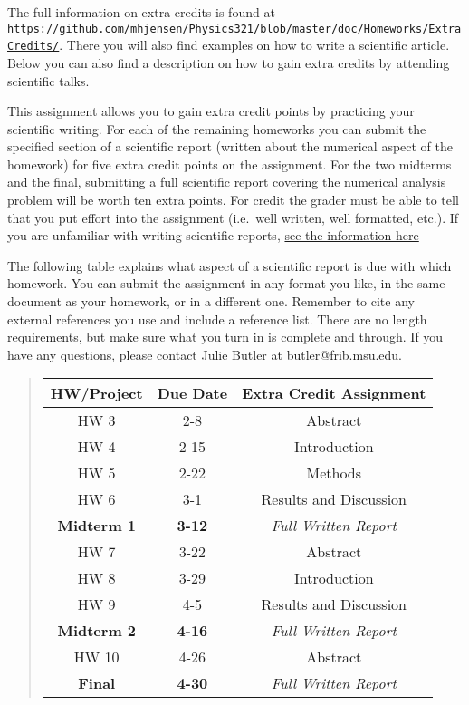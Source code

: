 \documentclass[%
oneside,                 %
final,                   %
10pt]{article}
\begin{document}
The full information on extra credits is found at \href{{https://github.com/mhjensen/Physics321/blob/master/doc/Homeworks/ExtraCredits/}}{\nolinkurl{https://github.com/mhjensen/Physics321/blob/master/doc/Homeworks/ExtraCredits/}}. There you will also find examples on how to write a scientific article. 
Below you can also find a description on how to gain extra credits by attending scientific talks.


This assignment allows you to gain extra credit points by practicing
your scientific writing.  For each of the remaining homeworks you can
submit the specified section of a scientific report (written about the
numerical aspect of the homework) for five extra credit points on the
assignment.  For the two midterms and the final, submitting a full
scientific report covering the numerical analysis problem will be
worth ten extra points.  For credit the grader must be able to tell
that you put effort into the assignment (i.e.~well written, well
formatted, etc.).  If you are unfamiliar with writing scientific
reports, \href{{https://github.com/mhjensen/Physics321/blob/master/doc/Homeworks/ExtraCredits/IntroductionScientificWriting.md}}{see the information here}

The following table explains what aspect of a scientific report is due
with which homework.  You can submit the assignment in any format you
like, in the same document as your homework, or in a different one.
Remember to cite any external references you use and include a
reference list.  There are no length requirements, but make sure what
you turn in is complete and through.  If you have any questions,
please contact Julie Butler at butler@frib.msu.edu.


\begin{quote}
\begin{tabular}{ccc}
\hline
\multicolumn{1}{c}{ HW/Project } & \multicolumn{1}{c}{ Due Date } & \multicolumn{1}{c}{ Extra Credit Assignment } \\
\hline
HW 3               & 2-8           & Abstract                   \\
HW 4               & 2-15          & Introduction               \\
HW 5               & 2-22          & Methods                    \\
HW 6               & 3-1           & Results and Discussion     \\
\textbf{Midterm 1} & \textbf{3-12} & \emph{Full Written Report} \\
HW 7               & 3-22          & Abstract                   \\
HW 8               & 3-29          & Introduction               \\
HW 9               & 4-5           & Results and Discussion     \\
\textbf{Midterm 2} & \textbf{4-16} & \emph{Full Written Report} \\
HW 10              & 4-26          & Abstract                   \\
\textbf{Final}     & \textbf{4-30} & \emph{Full Written Report} \\
\hline
\end{tabular}
\end{quote}
\end{document}

